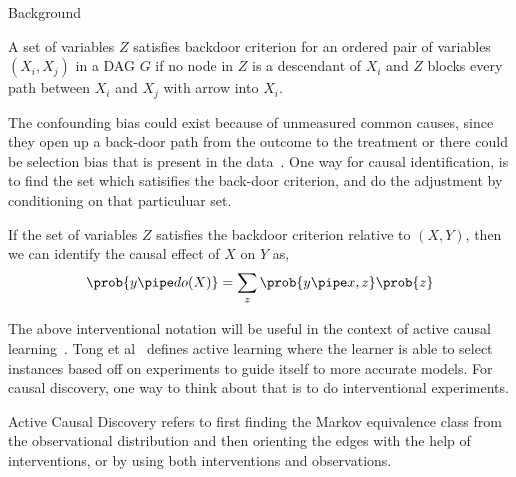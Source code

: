 \documentclass[10pt]{article}
\begin{document}
\begin{psection}[2]{Background}
    \begin{definition}
        A set of variables $Z$ satisfies backdoor criterion for an ordered pair of
        variables $(X_i, X_j)$ in a DAG $G$ if no node in $Z$ is a descendant of $X_i$
        and $Z$ blocks every path between $X_i$ and $X_j$ with arrow into $X_i$.  
    \end{definition}

    The confounding bias could exist because of unmeasured common causes, since they
    open up a back-door path from the outcome to the treatment or there could be
    selection bias that is present in the data~\cite{bareinboim2014recovering}. One way
    for causal identification, is to find the set which satisifies the back-door
    criterion, and do the adjustment by conditioning on that particuluar set. 

    \begin{definition}
        If the set of variables $Z$ satisfies the backdoor criterion relative to $(X,
        Y)$, then we can identify the causal effect of $X$ on $Y$ as,
        \begin{align*}
            \prob{y \pipe do(X)} = \sum_{z} \prob{y \pipe x, z} \prob{z}
        \end{align*}
    \end{definition}

    The above interventional notation will be useful in the context of active causal
    learning~\cite{he2008active}. Tong et al~\cite{tong2001active} defines active
    learning where the learner is able to select instances based off on experiments to
    guide itself to more accurate models. For causal discovery, one way to think about
    that is to do interventional experiments. 

    \begin{definition}
        Active Causal Discovery refers to first finding the Markov equivalence class
        from the observational distribution and then orienting the edges with the help
        of interventions, or by using both interventions and observations. 
    \end{definition}

\end{psection}
\end{document}
